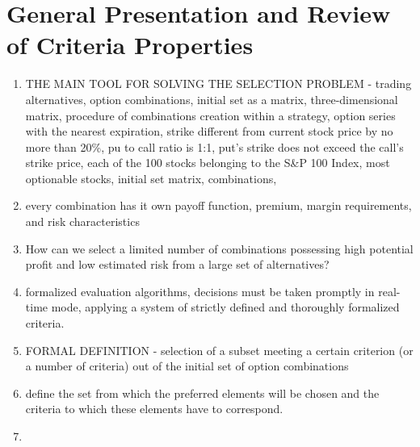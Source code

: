 \chapter{General Presentation and Review of Criteria Properties}



    \begin{enumerate}
        \item THE MAIN TOOL FOR SOLVING THE SELECTION PROBLEM - trading alternatives, option combinations, initial set as a matrix, three-dimensional matrix, procedure of combinations creation within a strategy, option series with the nearest expiration, strike different from current stock price by no more than 20\%, pu to call ratio is 1:1, put's strike does not exceed the call's strike price, each of the 100 stocks belonging to the S\&P 100 Index, most optionable stocks, initial set matrix, combinations,
        \item every combination has it own payoff function, premium, margin requirements, and risk characteristics
        \item How can we select a limited number of combinations possessing high potential profit and low estimated risk from a large set of alternatives?
        \item formalized evaluation algorithms, decisions must be taken promptly in real-time mode, applying a system of strictly defined and thoroughly formalized criteria.
        \item FORMAL DEFINITION - selection of a subset meeting a certain criterion (or a number of criteria) out of the initial set of option combinations
        \item define the set from which the preferred elements will be chosen and the criteria to which these elements have to correspond.
        \item 
    \end{enumerate}


